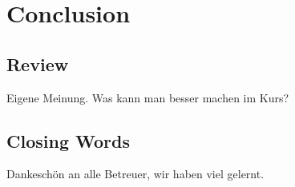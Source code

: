 \chapter{Conclusion}
\section{Review}
Eigene Meinung. Was kann man besser machen im Kurs?

\section{Closing Words}
Dankeschön an alle Betreuer, wir haben viel gelernt.